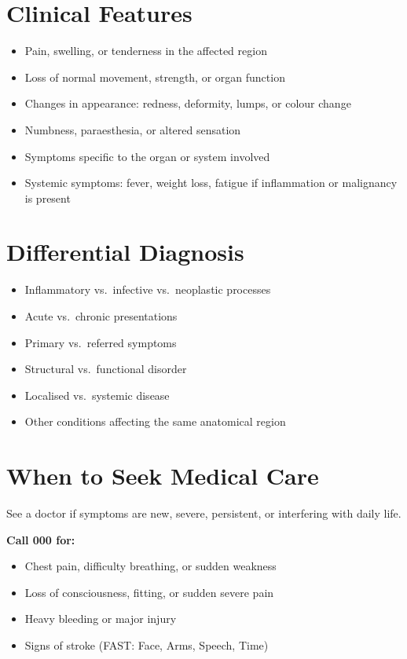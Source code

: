 \section*{Clinical Features}
\begin{itemize}
    \item Pain, swelling, or tenderness in the affected region
    \item Loss of normal movement, strength, or organ function
    \item Changes in appearance: redness, deformity, lumps, or colour change
    \item Numbness, paraesthesia, or altered sensation
    \item Symptoms specific to the organ or system involved
    \item Systemic symptoms: fever, weight loss, fatigue if inflammation or malignancy is present
\end{itemize}

\section*{Differential Diagnosis}
\begin{itemize}
    \item Inflammatory vs.\ infective vs.\ neoplastic processes
    \item Acute vs.\ chronic presentations
    \item Primary vs.\ referred symptoms
    \item Structural vs.\ functional disorder
    \item Localised vs.\ systemic disease
    \item Other conditions affecting the same anatomical region
\end{itemize}

\section*{When to Seek Medical Care}
See a doctor if symptoms are new, severe, persistent, or interfering with daily life.

\textbf{Call 000 for:}
\begin{itemize}
    \item Chest pain, difficulty breathing, or sudden weakness
    \item Loss of consciousness, fitting, or sudden severe pain
    \item Heavy bleeding or major injury
    \item Signs of stroke (FAST: Face, Arms, Speech, Time)
\end{itemize}

